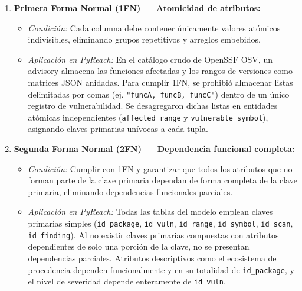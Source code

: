 \begin{enumerate}
    \item \textbf{Primera Forma Normal (1FN) --- Atomicidad de atributos:}
    \begin{itemize}
        \item \textit{Condición:} Cada columna debe contener únicamente valores atómicos indivisibles, eliminando grupos repetitivos y arreglos embebidos.
        \item \textit{Aplicación en PyReach:} En el catálogo crudo de OpenSSF OSV, un advisory almacena las funciones afectadas y los rangos de versiones como matrices JSON anidadas. Para cumplir 1FN, se prohibió almacenar listas delimitadas por comas (ej. \texttt{"funcA, funcB, funcC"}) dentro de un único registro de vulnerabilidad. Se desagregaron dichas listas en entidades atómicas independientes (\texttt{affected\_\allowbreak range} y \texttt{vulnerable\_\allowbreak symbol}), asignando claves primarias unívocas a cada tupla.
    \end{itemize}

    \item \textbf{Segunda Forma Normal (2FN) --- Dependencia funcional completa:}
    \begin{itemize}
        \item \textit{Condición:} Cumplir con 1FN y garantizar que todos los atributos que no forman parte de la clave primaria dependan de forma completa de la clave primaria, eliminando dependencias funcionales parciales.
        \item \textit{Aplicación en PyReach:} Todas las tablas del modelo emplean claves primarias simples (\texttt{id\_\allowbreak package}, \texttt{id\_\allowbreak vuln}, \texttt{id\_\allowbreak range}, \texttt{id\_\allowbreak symbol}, \texttt{id\_\allowbreak scan}, \texttt{id\_\allowbreak finding}). Al no existir claves primarias compuestas con atributos dependientes de solo una porción de la clave, no se presentan dependencias parciales. Atributos descriptivos como el ecosistema de procedencia dependen funcionalmente y en su totalidad de \texttt{id\_\allowbreak package}, y el nivel de severidad depende enteramente de \texttt{id\_\allowbreak vuln}.
    \end{itemize}


\end{enumerate}
